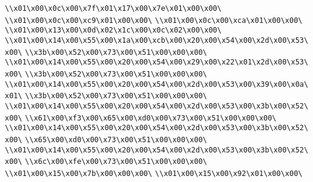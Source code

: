 \verb|\\x01\x00\x0c\x00\x7f\x01\x17\x00\x7e\x01\x00\x00\|\newline
\verb|\\x01\x00\x0c\x00\xc9\x01\x00\x00\|\newline
\verb|\\x01\x00\x0c\x00\xca\x01\x00\x00\|\newline
\verb|\\x01\x00\x13\x00\x0d\x02\x1c\x00\x0c\x02\x00\x00\|\newline
\verb|\\x01\x00\x14\x00\x55\x00\x1a\x00\xcb\x00\x20\x00\x54\x00\x2d\x00\x53\x00\|\newline
\verb|\\x3b\x00\x52\x00\x73\x00\x51\x00\x00\x00\|\newline
\verb|\\x01\x00\x14\x00\x55\x00\x20\x00\x54\x00\x29\x00\x22\x01\x2d\x00\x53\x00\|\newline
\verb|\\x3b\x00\x52\x00\x73\x00\x51\x00\x00\x00\|\newline
\verb|\\x01\x00\x14\x00\x55\x00\x20\x00\x54\x00\x2d\x00\x53\x00\x39\x00\x0a\x01\|\newline
\verb|\\x3b\x00\x52\x00\x73\x00\x51\x00\x00\x00\|\newline
\verb|\\x01\x00\x14\x00\x55\x00\x20\x00\x54\x00\x2d\x00\x53\x00\x3b\x00\x52\x00\|\newline
\verb|\\x61\x00\xf3\x00\x65\x00\xd0\x00\x73\x00\x51\x00\x00\x00\|\newline
\verb|\\x01\x00\x14\x00\x55\x00\x20\x00\x54\x00\x2d\x00\x53\x00\x3b\x00\x52\x00\|\newline
\verb|\\x65\x00\xd0\x00\x73\x00\x51\x00\x00\x00\|\newline
\verb|\\x01\x00\x14\x00\x55\x00\x20\x00\x54\x00\x2d\x00\x53\x00\x3b\x00\x52\x00\|\newline
\verb|\\x6c\x00\xfe\x00\x73\x00\x51\x00\x00\x00\|\newline
\verb|\\x01\x00\x15\x00\x7b\x00\x00\x00\|\newline
\verb|\\x01\x00\x15\x00\x92\x01\x00\x00\|\newline
